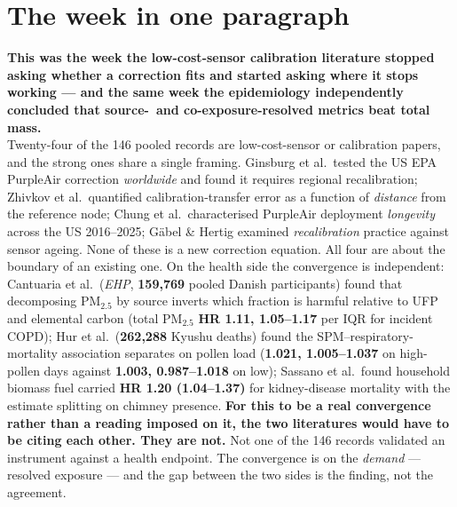 \documentclass[10pt]{article}
\begin{document}
\vspace{6mm}

\section*{\sffamily\bfseries\color{Deep}The week in one paragraph}
\vspace{-1.5mm}{\color{Teal}\rule{\linewidth}{1.1pt}}\vspace{2.5mm}

\begin{keybox}
{\sffamily\bfseries\small\color{Deep}This was the week the low-cost-sensor calibration
literature stopped asking whether a correction fits and started asking where it stops
working --- and the same week the epidemiology independently concluded that
source-\ and co-exposure-resolved metrics beat total mass.}\\[1.4mm]
\footnotesize
Twenty-four of the 146 pooled records are low-cost-sensor or calibration papers, and the
strong ones share a single framing. Ginsburg et al.\ tested the US EPA PurpleAir
correction \emph{worldwide} and found it requires regional recalibration; Zhivkov et al.\
quantified calibration-transfer error as a function of \emph{distance} from the reference
node; Chung et al.\ characterised PurpleAir deployment \emph{longevity} across the US
2016--2025; Gäbel \& Hertig examined \emph{recalibration} practice against sensor
ageing. None of these is a new correction equation. All four are about the boundary of an
existing one. On the health side the convergence is independent: Cantuaria et al.\
(\textit{EHP}, \textbf{159{,}769} pooled Danish participants) found that decomposing
PM$_{2.5}$ by source inverts which fraction is harmful relative to UFP and elemental
carbon (total PM$_{2.5}$ \textbf{HR 1.11, 1.05--1.17} per IQR for incident COPD);
Hur et al.\ (\textbf{262{,}288} Kyushu deaths) found the SPM--respiratory-mortality
association separates on pollen load (\textbf{1.021, 1.005--1.037} on high-pollen days
against \textbf{1.003, 0.987--1.018} on low); Sassano et al.\ found household biomass
fuel carried \textbf{HR 1.20 (1.04--1.37)} for kidney-disease mortality with the estimate
splitting on chimney presence. \textbf{For this to be a real convergence rather than a
reading imposed on it, the two literatures would have to be citing each other. They are
not.} Not one of the 146 records validated an instrument against a health endpoint. The
convergence is on the \emph{demand} --- resolved exposure --- and the gap between the two
sides is the finding, not the agreement.
\end{keybox}
\end{document}
